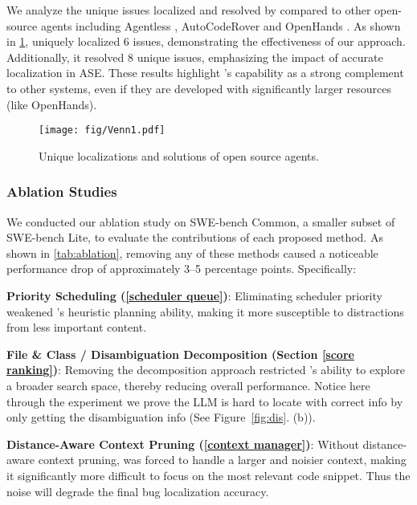 We analyze the unique issues localized and resolved by \nickname compared to other open-source agents including Agentless \cite{xia2024agentless}, AutoCodeRover \cite{zhang2024autocoderover} and OpenHands \cite{wang2024openhands}. As shown in \cref{fig:venn}, \nickname uniquely localized 6 issues, demonstrating the effectiveness of our approach. Additionally, it resolved 8 unique issues, emphasizing the impact of accurate localization in ASE. These results highlight \nickname's capability as a strong complement to other systems, even if they are developed with significantly larger resources (like OpenHands).

\begin{figure}[t]
    \centering
    \centerline{\texttt{[image: fig/Venn1.pdf]}}
    \caption{Unique localizations and solutions of open source agents.}
    \label{fig:venn}
\end{figure}

\subsubsection{Ablation Studies}

We conducted our ablation study on SWE-bench Common, a smaller subset of SWE-bench Lite, to evaluate the contributions of each proposed method. As shown in \cref{tab:ablation}, removing any of these methods caused a noticeable performance drop of approximately 3–5 percentage points. Specifically:

\squishlist

\item \textbf{Priority Scheduling (\cref{scheduler queue})}: Eliminating scheduler priority weakened \nickname’s heuristic planning ability, making it more susceptible to distractions from less important content.

\item \textbf{File \& Class / Disambiguation Decomposition (Section \ref{score ranking})}: Removing the decomposition approach restricted \nickname’s ability to explore a broader search space, thereby reducing overall performance. Notice here through the experiment we prove the LLM is hard to locate with correct info by only getting the disambiguation info (See Figure~\ref{fig:dis}. (b)). 

\item \textbf{Distance-Aware Context Pruning (\cref{context manager})}: Without distance-aware context pruning, \nickname was forced to handle a larger and noisier context, making it significantly more difficult to focus on the most relevant code snippet. Thus the noise will degrade the final bug localization accuracy. 

